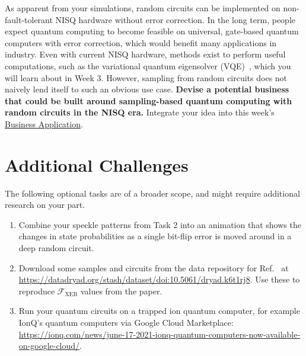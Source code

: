 \documentclass[12pt]{article}
\begin{document}
As apparent from your simulations, random circuits can be implemented on non-fault-tolerant NISQ hardware without error correction.
In the long term, people expect quantum computing to become feasible on universal, gate-based quantum computers with error correction, 
which would benefit many applications in industry.
Even with current NISQ hardware, methods exist to perform useful computations, such as the variational quantum eigensolver (VQE)~\cite{peruzzo2014variational},
which you will learn about in Week 3.
However, sampling from random circuits does not naively lend itself to such an obvious use case.
\textbf{Devise a potential business that could be built around sampling-based quantum computing with random circuits in the NISQ era.}
Integrate your idea into this week's \href{https://github.com/CDL-Quantum/CohortProject_2021/blob/main/Week1_Trapped_Ions/Business_Application.md}{Business Application}.

\section*{Additional Challenges}

The following optional tasks are of a broader scope, and might require additional research on your part.

\begin{enumerate}

\item Combine your speckle patterns from Task 2 into an animation that shows the changes in state probabilities as a single bit-flip error is moved around in a deep random circuit.

\item Download some samples and circuits from the data repository for Ref.~ at \url{https://datadryad.org/stash/dataset/doi:10.5061/dryad.k6t1rj8}.
Use these to reproduce $\mathcal{F}_\mathrm{XEB}$ values from the paper.

\item Run your quantum circuits on a trapped ion quantum computer, for example IonQ's quantum computers via Google Cloud Marketplace: \url{https://ionq.com/news/june-17-2021-ionq-quantum-computers-now-available-on-google-cloud/}.

\end{enumerate}



\end{document}
